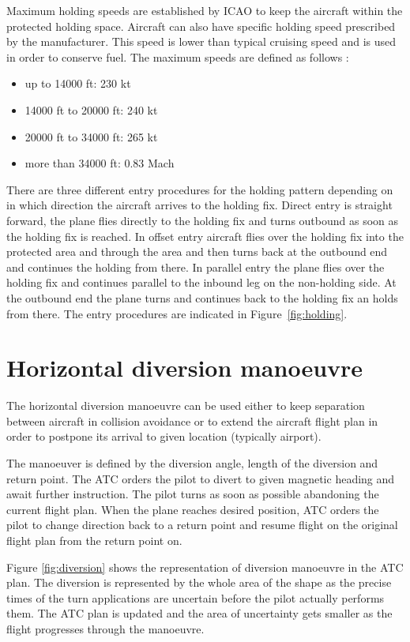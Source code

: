 Maximum holding speeds are established by ICAO to keep the aircraft within the protected holding space. Aircraft can also have specific holding speed prescribed by the manufacturer. This speed is lower than typical cruising speed and is used in order to conserve fuel. The maximum speeds are defined as follows \cite[Section 6]{doc8168}:

\begin{itemize}
\item up to 14000 ft: 230 kt
\item 14000 ft to 20000 ft: 240 kt
\item 20000 ft to 34000 ft: 265 kt
\item more than 34000 ft: 0.83 Mach
\end{itemize}

There are three different entry procedures for the holding pattern depending on in which direction the aircraft arrives to the holding fix. Direct entry is straight forward, the plane flies directly to the holding fix and turns outbound as soon as the holding fix is reached. In offset entry aircraft flies over the holding fix into the protected area and through the area and then turns back at the outbound end and continues the holding from there. In parallel entry the plane flies over the holding fix and continues parallel to the inbound leg on the non-holding side. At the outbound end the plane turns and continues back to the holding fix an holds from there. The entry procedures are indicated in Figure~\ref{fig:holding}.

\section{Horizontal diversion manoeuvre}

The horizontal diversion manoeuvre can be used either to keep separation between aircraft in collision avoidance or to extend the aircraft flight plan in order to postpone its arrival to given location (typically airport).

The manoeuver is defined by the diversion angle, length of the diversion and return point. The ATC orders the pilot to divert to given magnetic heading and await further instruction. The pilot turns as soon as possible abandoning the current flight plan. When the plane reaches desired position, ATC orders the pilot to change direction back to a return point and resume flight on the original flight plan from the return point on.

Figure \ref{fig:diversion} shows the representation of diversion manoeuvre in the ATC plan. The diversion is represented by the whole area of the shape as the precise times of the turn applications are uncertain before the pilot actually performs them. The ATC plan is updated and the area of uncertainty gets smaller as the flight progresses through the manoeuvre.

